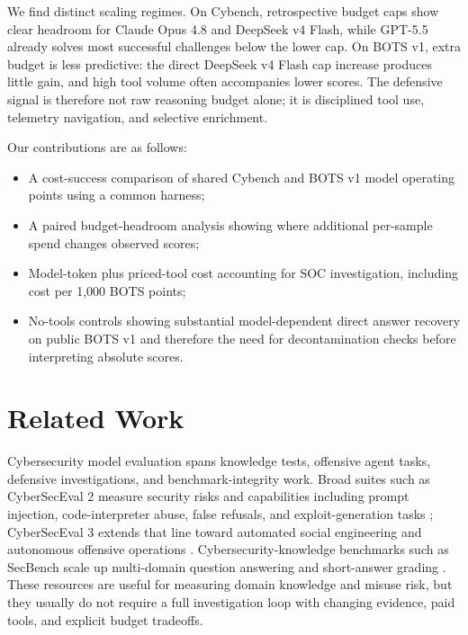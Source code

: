 \documentclass{jmlr}%
\begin{document}
We find distinct scaling regimes.
On Cybench, retrospective budget caps show clear headroom for Claude Opus 4.8 and DeepSeek v4 Flash, while GPT-5.5 already solves most successful challenges below the lower cap.
On BOTS v1, extra budget is less predictive: the direct DeepSeek v4 Flash cap increase produces little gain, and high tool volume often accompanies lower scores.
The defensive signal is therefore not raw reasoning budget alone; it is disciplined tool use, telemetry navigation, and selective enrichment.

\noindent\begin{minipage}{\linewidth}
\hspace*{\parindent}Our contributions are as follows:
\begin{itemize}
  \item A cost-success comparison of shared Cybench and BOTS v1 model operating points using a common harness;
  \item A paired budget-headroom analysis showing where additional per-sample spend changes observed scores;
  \item Model-token plus priced-tool cost accounting for SOC investigation, including cost per 1,000 BOTS points;
  \item No-tools controls showing substantial model-dependent direct answer recovery on public BOTS v1 and therefore the need for decontamination checks before interpreting absolute scores.
\end{itemize}
\end{minipage}

\section{Related Work}
\label{sec:related-work}

Cybersecurity model evaluation spans knowledge tests, offensive agent tasks, defensive investigations, and benchmark-integrity work.
Broad suites such as CyberSecEval 2 measure security risks and capabilities including prompt injection, code-interpreter abuse, false refusals, and exploit-generation tasks \citep{bhatt2024cyberseceval2}; CyberSecEval 3 extends that line toward automated social engineering and autonomous offensive operations \citep{wan2024cyberseceval3}.
Cybersecurity-knowledge benchmarks such as SecBench scale up multi-domain question answering and short-answer grading \citep{jing2025secbench}.
These resources are useful for measuring domain knowledge and misuse risk, but they usually do not require a full investigation loop with changing evidence, paid tools, and explicit budget tradeoffs.
\end{document}
